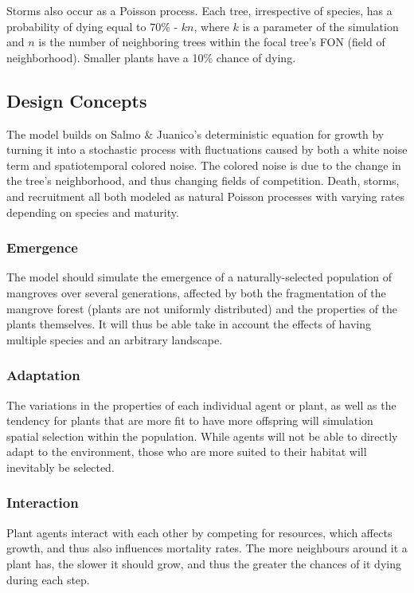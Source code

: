 Storms also occur as a Poisson process. Each tree, irrespective of species, has a probability of dying equal to 70\% - $kn$, where $k$ is a parameter of the simulation and $n$ is the number of neighboring trees within the focal tree's FON (field of neighborhood). Smaller plants have a 10\% chance of dying.

\subsection{Design Concepts}
The model builds on Salmo \& Juanico's deterministic equation for growth by turning it into a stochastic process with fluctuations caused by both a white noise term and spatiotemporal colored noise. The colored noise is due to the change in the tree's neighborhood, and thus changing fields of competition. Death, storms, and recruitment all both modeled as natural Poisson processes with varying rates depending on species and maturity.

\subsubsection{Emergence}
The model should simulate the emergence of a naturally-selected population of mangroves over several generations, affected by both the fragmentation of the mangrove forest (plants are not uniformly distributed) and the properties of the plants themselves. It will thus be able take in account the effects of having multiple species and an arbitrary landscape.

\subsubsection{Adaptation}
The variations in the properties of each individual agent or plant, as well as the tendency for plants that are more fit to have more offspring will simulation spatial selection within the population. While agents will not be able to directly adapt to the environment, those who are more suited to their habitat will inevitably be selected.

\subsubsection{Interaction}
Plant agents interact with each other by competing for resources, which affects growth, and thus also influences mortality rates. The more neighbours around it a plant has, the slower it should grow, and thus the greater the chances of it dying during each step.

